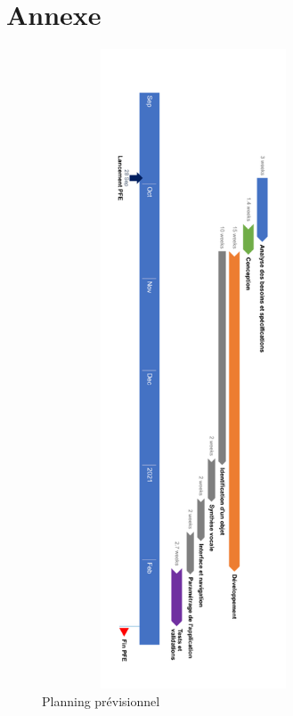 \documentclass[CDS,UTF8,final]{EPURapport}
\begin{document}
\newpage

\section{Annexe}

\begin{figure}[h!]
\centering
  \includegraphics[height=19cm,width=9cm]{images/PlanningPrevRotate.png}
  \caption{Planning prévisionnel}
  \label{fig:planningprev}
\end{figure}
\end{document}
